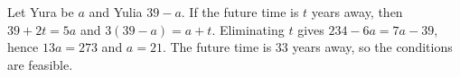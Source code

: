 Let Yura be $a$ and Yulia $39-a$. If the future time is $t$ years away, then $39+2t=5a$ and $3(39-a)=a+t$. Eliminating $t$ gives $234-6a=7a-39$, hence $13a=273$ and $\boxed{a=21}$. The future time is $33$ years away, so the conditions are feasible.
